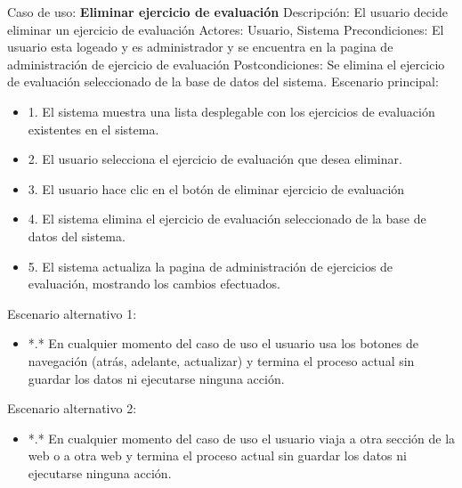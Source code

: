 Caso de uso: \textbf{Eliminar ejercicio de evaluación}
\newline
Descripción: El usuario decide eliminar un ejercicio de evaluación
\newline
Actores: Usuario, Sistema
\newline
Precondiciones: El usuario esta logeado y es administrador y se encuentra en la pagina de administración de ejercicio de evaluación
\newline
Postcondiciones: Se elimina el ejercicio de evaluación seleccionado de la base de datos del sistema.
\newline
Escenario principal:
\begin{itemize}
	\item 1. El sistema muestra una lista desplegable con los ejercicios de evaluación existentes en el sistema.
	\item 2. El usuario selecciona el ejercicio de evaluación que desea eliminar.
	\item 3. El usuario hace clic en el botón de eliminar ejercicio de evaluación
	\item 4. El sistema elimina el ejercicio de evaluación seleccionado de la base de datos del sistema.
	\item 5. El sistema actualiza la pagina de administración de ejercicios de evaluación, mostrando los cambios efectuados.
\end{itemize}
Escenario alternativo 1: 
\begin{itemize}
	\item *.* En cualquier momento del caso de uso el usuario usa los botones de navegación (atrás, adelante, actualizar) y termina el proceso actual sin guardar los datos ni ejecutarse ninguna acción.
\end{itemize}
Escenario alternativo 2:
\begin{itemize}
	\item *.* En cualquier momento del caso de uso el usuario viaja a otra sección de la web o a otra web y termina el proceso actual sin guardar los datos ni ejecutarse ninguna acción.
\end{itemize}

